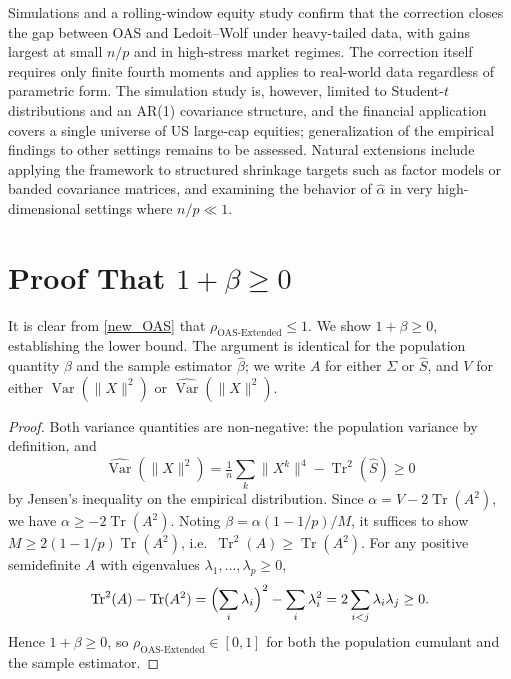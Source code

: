 \documentclass[10pt,twoside,titlepage]{article}
\begin{document}
Simulations and a rolling-window equity study confirm that the correction closes the gap
between OAS and Ledoit--Wolf under heavy-tailed data, with gains largest at small
$n/p$ and in high-stress market regimes.
The correction itself requires only finite fourth moments and applies to real-world data
regardless of parametric form.
The simulation study is, however, limited to Student-$t$ distributions and an AR(1)
covariance structure, and the financial application covers a single universe of US
large-cap equities; generalization of the empirical findings to other settings remains
to be assessed.
Natural extensions include applying the framework to structured shrinkage targets such as
factor models or banded covariance matrices, and examining the behavior of $\hat{\alpha}$
in very high-dimensional settings where $n/p \ll 1$.

\clearpage

\appendix
\section{Proof That $1 + \beta \geq 0$}
\label{app:proof}
It is clear from \eqref{new_OAS} that $\rho_{\text{OAS-Extended}} \leq 1$.
We show $1 + \beta \geq 0$, establishing the lower bound.
The argument is identical for the population quantity $\beta$ and the sample estimator
$\hat{\beta}$; we write $A$ for either $\Sigma$ or $\hat{S}$, and $V$ for either
$\operatorname{Var}(\lVert X \rVert^2)$ or $\widehat{\operatorname{Var}}(\lVert X \rVert^2)$.

\begin{proof}
Both variance quantities are non-negative: the population variance by definition, and
\[
\widehat{\operatorname{Var}}(\lVert X \rVert^2)
  = \tfrac{1}{n}\sum_k \lVert X^k \rVert^4 - \operatorname{Tr}^2(\hat{S}) \geq 0
\]
by Jensen's inequality on the empirical distribution.
Since $\alpha = V - 2\operatorname{Tr}(A^2)$, we have $\alpha \geq -2\operatorname{Tr}(A^2)$.
Noting $\beta = \alpha(1-1/p)/M$, it suffices to show $M \geq 2(1-1/p)\operatorname{Tr}(A^2)$,
i.e.\ $\operatorname{Tr}^2(A) \geq \operatorname{Tr}(A^2)$.
For any positive semidefinite $A$ with eigenvalues $\lambda_1, \ldots, \lambda_p \geq 0$,
\[
\operatorname{Tr}^2(A) - \operatorname{Tr}(A^2)
= \Bigl(\sum_i \lambda_i\Bigr)^2 - \sum_i \lambda_i^2
= 2\sum_{i < j} \lambda_i \lambda_j \geq 0.
\]
Hence $1 + \beta \geq 0$, so $\rho_{\text{OAS-Extended}} \in [0,1]$ for both the
population cumulant and the sample estimator.
\end{proof}
\end{document}
